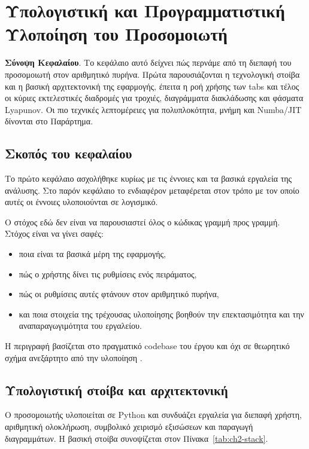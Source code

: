 \chapter{Υπολογιστική και Προγραμματιστική Υλοποίηση του Προσομοιωτή}
\label{ch:computational-implementation}

\noindent\textbf{Σύνοψη Κεφαλαίου}.
Το κεφάλαιο αυτό δείχνει πώς περνάμε από τη διεπαφή του προσομοιωτή στον
αριθμητικό πυρήνα. Πρώτα παρουσιάζονται η τεχνολογική στοίβα και η βασική
αρχιτεκτονική της εφαρμογής, έπειτα η ροή χρήσης των tabs και τέλος οι κύριες
εκτελεστικές διαδρομές για τροχιές, διαγράμματα διακλάδωσης και φάσματα
Lyapunov. Οι πιο τεχνικές λεπτομέρειες για πολυπλοκότητα, μνήμη και
Numba/JIT δίνονται στο Παράρτημα.

\section{Σκοπός του κεφαλαίου}
\label{sec:ch2-purpose}

Το πρώτο κεφάλαιο ασχολήθηκε κυρίως με τις έννοιες και τα βασικά εργαλεία της
ανάλυσης. Στο παρόν κεφάλαιο το ενδιαφέρον μεταφέρεται στον τρόπο με τον οποίο
αυτές οι έννοιες υλοποιούνται σε λογισμικό.

Ο στόχος εδώ δεν είναι να παρουσιαστεί όλος ο κώδικας γραμμή προς γραμμή.
Στόχος είναι να γίνει σαφές:
\begin{itemize}
\item ποια είναι τα βασικά μέρη της εφαρμογής,
\item πώς ο χρήστης δίνει τις ρυθμίσεις ενός πειράματος,
\item πώς οι ρυθμίσεις αυτές φτάνουν στον αριθμητικό πυρήνα,
\item και ποια στοιχεία της τρέχουσας υλοποίησης βοηθούν την επεκτασιμότητα και
την αναπαραγωγιμότητα του εργαλείου.
\end{itemize}

Η περιγραφή βασίζεται στο πραγματικό codebase του έργου και όχι σε θεωρητικό
σχήμα ανεξάρτητο από την υλοποίηση
\cite{nlds_internal_md_docs,nlds_src_app_main}.

\section{Υπολογιστική στοίβα και αρχιτεκτονική}
\label{sec:ch2-stack-architecture}

Ο προσομοιωτής υλοποιείται σε Python και συνδυάζει εργαλεία για διεπαφή
χρήστη, αριθμητική ολοκλήρωση, συμβολικό χειρισμό εξισώσεων και παραγωγή
διαγραμμάτων. Η βασική στοίβα συνοψίζεται στον Πίνακα~\ref{tab:ch2-stack}.

